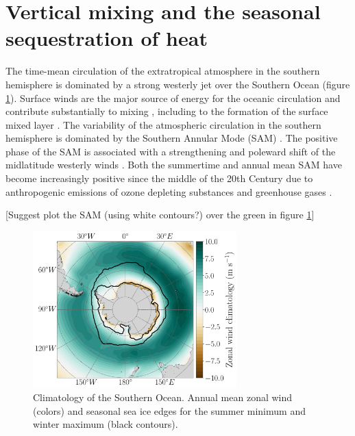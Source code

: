 \documentclass{ametsocV5}
\begin{document}


\section{Vertical mixing and the seasonal sequestration of heat} %
\label{sec:subsurface_heat_sequestration}

The time-mean circulation of the extratropical atmosphere in the southern hemisphere is dominated by a strong westerly jet over the Southern Ocean (figure \ref{fig:zonal_wind_clim}). Surface winds are the major source of energy for the oceanic circulation \citep{Wunsch1998} and contribute substantially to mixing \citep{Munk1998}, including to the formation of the surface mixed layer \citep{Pollard1972,Wunsch2004}. The variability of the atmospheric circulation in the southern hemisphere is dominated by the Southern Annular Mode (SAM) \citep{Gong1999,Thompson2000}. The positive phase of the SAM is associated with a strengthening and poleward shift of the midlatitude westerly winds \citep{Thompson2000}. Both the summertime and annual mean SAM have become increasingly positive since the middle of the 20th Century \citep{Jones2016,Marshall2003a} due to anthropogenic emissions of ozone depleting substances and greenhouse gases \citep[see e.g.][]{Polvani2011,Swart2012,Thompson2011a}.

[Suggest plot the SAM (using white contours?) over the green in figure \ref{fig:zonal_wind_clim}]


\begin{figure}[!ht] 
    \begin{center} 
        \includegraphics[width=0.7\textwidth]{figures/zonal_wind_clim.pdf} 
        \caption{Climatology of the Southern Ocean. Annual mean zonal wind (colors) and seasonal sea ice edges for the summer minimum and winter maximum (black contours).} 
        \label{fig:zonal_wind_clim} 
    \end{center} 
\end{figure} 
\end{document}
